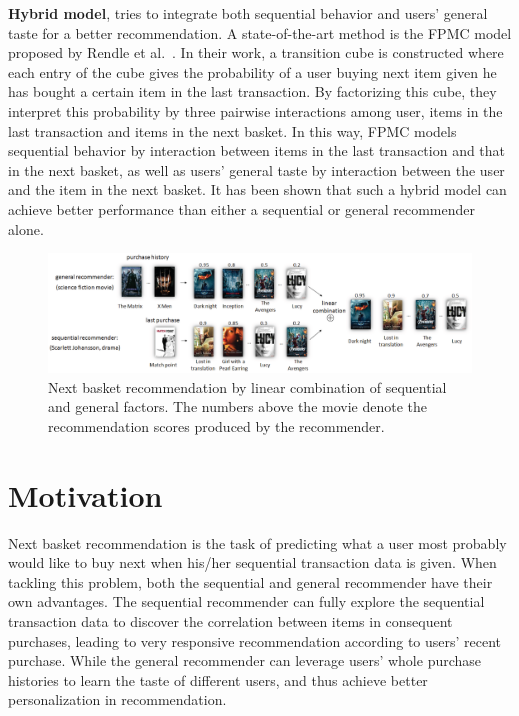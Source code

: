 \documentclass[10pt,journal,compsoc]{IEEEtran}
\begin{document}
\textbf{Hybrid model}, tries to integrate both sequential behavior and users' general taste for a better recommendation. A state-of-the-art method is the FPMC model proposed by Rendle et al.~\cite{fpmc}. In their work, a transition cube is constructed where each entry of the cube gives the probability of a user buying next item given he has bought a certain item in the last transaction. By factorizing this cube, they interpret this probability by three pairwise interactions among user, items in the last transaction and items in the next basket. In this way, FPMC models sequential behavior by interaction between items in the last transaction and that in the next basket, as well as users' general taste by interaction between the user and the item in the next basket. It has been shown that such a hybrid model can achieve better performance than either a sequential or general recommender alone.

\begin{figure}[htbp]
\centering
\includegraphics[scale=0.33,viewport=40 80 1300 460,clip=true]{linear.eps}
\caption{\label{fig:linear}Next basket recommendation by linear combination of sequential and general factors. The numbers above the movie denote the recommendation scores produced by the recommender.}
\end{figure}

\section{Motivation}
Next basket recommendation is the task of predicting what a user most probably would like to buy next when his/her sequential transaction data is given. When tackling this problem, both the sequential and general recommender have their own advantages. The sequential recommender can fully explore the  sequential transaction data to discover the correlation between items in consequent purchases, leading to very responsive recommendation according to users' recent purchase. While the general recommender can leverage users' whole purchase histories to learn the taste of different users, and thus achieve better personalization in recommendation.
\end{document}
